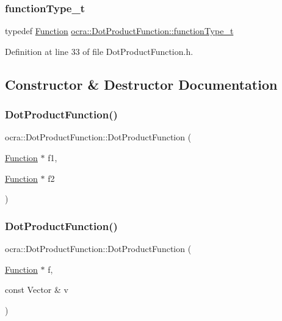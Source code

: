 \subsubsection{\texorpdfstring{function\+Type\+\_\+t}{functionType\_t}}
{\footnotesize\ttfamily typedef \hyperlink{classocra_1_1Function}{Function} \hyperlink{classocra_1_1DotProductFunction_abdc60b6380ffedc075792224bd908c48}{ocra\+::\+Dot\+Product\+Function\+::function\+Type\+\_\+t}}



Definition at line 33 of file Dot\+Product\+Function.\+h.



\subsection{Constructor \& Destructor Documentation}
\hypertarget{classocra_1_1DotProductFunction_a70f7d2b9c9fefba0203fbee84607c9e9}{}\label{classocra_1_1DotProductFunction_a70f7d2b9c9fefba0203fbee84607c9e9} 
\subsubsection{\texorpdfstring{Dot\+Product\+Function()}{DotProductFunction()}\hspace{0.1cm}{\footnotesize\ttfamily [1/2]}}
{\footnotesize\ttfamily ocra\+::\+Dot\+Product\+Function\+::\+Dot\+Product\+Function (\begin{DoxyParamCaption}\item[{\hyperlink{classocra_1_1Function}{Function} $\ast$}]{f1,  }\item[{\hyperlink{classocra_1_1Function}{Function} $\ast$}]{f2 }\end{DoxyParamCaption})}

\hypertarget{classocra_1_1DotProductFunction_a369a245fec0cfe2d4f72bfd577ab7ad0}{}\label{classocra_1_1DotProductFunction_a369a245fec0cfe2d4f72bfd577ab7ad0} 
\subsubsection{\texorpdfstring{Dot\+Product\+Function()}{DotProductFunction()}\hspace{0.1cm}{\footnotesize\ttfamily [2/2]}}
{\footnotesize\ttfamily ocra\+::\+Dot\+Product\+Function\+::\+Dot\+Product\+Function (\begin{DoxyParamCaption}\item[{\hyperlink{classocra_1_1Function}{Function} $\ast$}]{f,  }\item[{const Vector \&}]{v }\end{DoxyParamCaption})}



